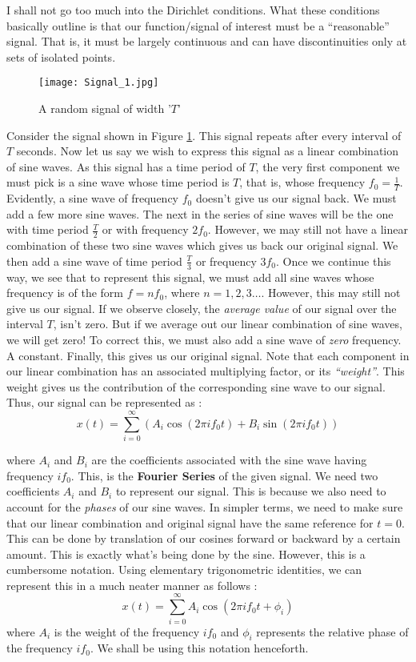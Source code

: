 \documentclass{article}
\theoremstyle{definition}
\begin{document}
	 I shall not go too much into the Dirichlet conditions. What these conditions basically outline is that our function/signal of interest must be a ``reasonable'' signal. That is, it  must be largely continuous and can have discontinuities only at sets of isolated points. \smallskip
	 
	 \begin{figure}[h!]
	 \centering
	 \texttt{[image: Signal\_1.jpg]}
	 \caption{A random signal of width '$T$'}
	 \label{fig:signal1}
	 \end{figure}	 
	 Consider the signal shown in Figure \ref{fig:signal1}. This signal repeats after every interval of $T$ seconds. Now let us say we wish to express this signal as a linear combination of sine waves. As this signal has a time period of $T$, the very first component we must pick is a sine wave whose time period is $T$, that is, whose frequency $f_0 = \frac{1}{T}$. Evidently, a sine wave of frequency $f_0$ doesn't give us our signal back. We must add a few more sine waves. The next in the series of sine waves will be the one with time period $\frac{T}{2}$ or with frequency $2f_0$. However, we may still not have a linear combination of these two sine waves which gives us back our original signal. We then add a sine wave of time period $\frac{T}{3}$ or frequency $3f_0$. Once we continue this way, we see that to represent this signal, we must add all sine waves whose frequency is of the form $f = nf_0$, where $n = 1,2,3 \ldots$. However, this may still not give us our signal. If we observe closely, the \textit{average value} of our signal over the interval $T$, isn't zero. But if we average out our linear combination of sine waves, we will get zero! To correct this, we must also add a sine wave of \textit{zero} frequency. A constant. Finally, this gives us our original signal. Note that each component in our linear combination has an associated multiplying factor, or its \textit{``weight''}. This weight gives us the contribution of the corresponding sine wave to our signal. Thus, our signal can be represented as : 
	 \[x(t) = \sum_{i=0}^{\infty} (A_i \cos(2\pi if_0t) + B_i \sin(2\pi if_0t))\]
	 
	 where $A_i$ and $B_i$ are the coefficients associated with the sine wave having frequency $if_0$. This, is the \textbf{Fourier Series} of the given signal. We need two coefficients $A_i$ and $B_i$ to represent our signal. This is because we also need to account for the \textit{phases} of our sine waves. In simpler terms, we need to make sure that our linear combination and original signal have the same reference for $t=0$. This can be done by translation of our cosines forward or backward by a certain amount. This is exactly what's being done by the sine. However, this is a cumbersome notation. Using elementary trigonometric identities, we can represent this in a much neater manner as follows : 
	 \[
	 x(t) = \sum_{i=0}^{\infty} A_i \cos(2\pi if_0t + \phi_i)
	 \]
	 where $A_i$ is the weight of the frequency $if_0$ and $\phi_i$ represents the relative phase of the frequency $if_0$. We shall be using this notation henceforth. \smallskip
	 
\end{document}

